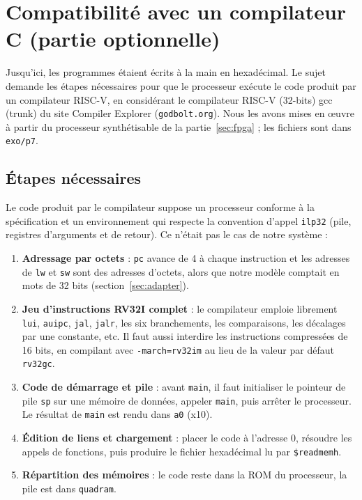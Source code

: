 \section{Compatibilité avec un compilateur C (partie optionnelle)}
\label{sec:compilateur}

Jusqu'ici, les programmes étaient écrits à la main en hexadécimal. Le sujet demande les
étapes nécessaires pour que le processeur exécute le code produit par un compilateur
RISC-V, en considérant le compilateur \og RISC-V (32-bits) gcc (trunk)\fg{} du site Compiler
Explorer (\texttt{godbolt.org}). Nous les avons mises en œuvre à partir du processeur
synthétisable de la partie~\ref{sec:fpga} ; les fichiers sont dans \texttt{exo/p7}.

\subsection{Étapes nécessaires}

Le code produit par le compilateur suppose un processeur conforme à la spécification et un
environnement qui respecte la convention d'appel \texttt{ilp32} (pile, registres
d'arguments et de retour). Ce n'était pas le cas de notre système :
\begin{enumerate}
\item \textbf{Adressage par octets} : \texttt{pc} avance de 4 à chaque instruction et les
adresses de \texttt{lw} et \texttt{sw} sont des adresses d'octets, alors que notre modèle
comptait en mots de 32 bits (section~\ref{sec:adapter}).
\item \textbf{Jeu d'instructions RV32I complet} : le compilateur emploie librement
\texttt{lui}, \texttt{auipc}, \texttt{jal}, \texttt{jalr}, les six branchements, les
comparaisons, les décalages par une constante, etc. Il faut aussi interdire les
instructions compressées de 16 bits, en compilant avec \texttt{-march=rv32im} au lieu de
la valeur par défaut \texttt{rv32gc}.
\item \textbf{Code de démarrage et pile} : avant \texttt{main}, il faut initialiser le
pointeur de pile \texttt{sp} sur une mémoire de données, appeler \texttt{main}, puis arrêter
le processeur. Le résultat de \texttt{main} est rendu dans \texttt{a0} (x10).
\item \textbf{Édition de liens et chargement} : placer le code à l'adresse 0, résoudre les
appels de fonctions, puis produire le fichier hexadécimal lu par \texttt{\$readmemh}.
\item \textbf{Répartition des mémoires} : le code reste dans la ROM du processeur, la pile
est dans \texttt{quadram}.
\end{enumerate}

